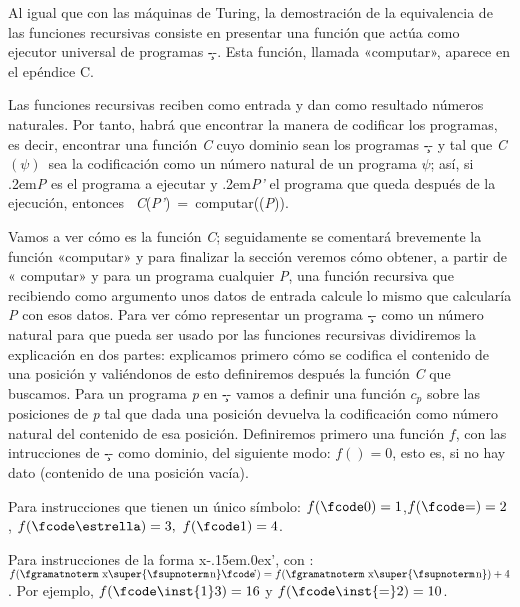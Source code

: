 Al igual que con las máquinas de Turing, la demostración de la equivalencia de las funciones
recursivas consiste en presentar una función que actúa como ejecutor universal de programas \c--.
Esta función, llamada «{\fgabrielen computar}», aparece en el epéndice C.

Las funciones recursivas reciben como entrada y dan como resultado números naturales. Por tanto,
habrá que encontrar la manera de codificar los programas, es decir, encontrar una función {\it C}
cuyo dominio sean los programas \c-- y tal que {\it C$ (\psi) $}\ sea la codificación
como un número natural de un programa $ \psi $; así, si \kern.2em{\it P\/} es el programa
a ejecutar y \kern.2em{\it P'\/} el programa que queda después de la ejecución, entonces \hbox{{\it
C}({\it P'}) = {\fgabrielen computar}(({\it P}))}.

Vamos a ver cómo es la función {\it C}; seguidamente se comentará brevemente la función
«{\fgabrielen computar}» y para finalizar la sección veremos cómo obtener, a partir de «{\fgabrielen
computar}» y para un programa cualquier {\it P}, una función recursiva que recibiendo como argumento
unos datos de entrada calcule lo mismo que calcularía {\it P} con esos datos.
Para ver cómo representar un programa \c-- como un número natural para que pueda ser usado por las
funciones recursivas dividiremos la explicación en dos partes: explicamos primero cómo se codifica
el contenido de una posición y valiéndonos de esto definiremos después la función {\it C} que
buscamos.
Para un programa {\it p} en \c-- vamos a definir una función $ c_p $ sobre las posiciones de {\it p}
tal que dada una posición devuelva la codificación como número natural del contenido de esa
posición. Definiremos primero una función $ f $, con las intrucciones de \c-- como dominio, del
siguiente modo:
\listanormal
$ f()= 0$, esto es, si no hay dato (contenido de una posición vacía).

Para instrucciones que tienen un único símbolo:
\espacioej$ f(\hbox{\fcode0})= 1$,\hskip22pt$ f(\hbox{\fcode=})=2 $,\hskip22pt $
f(\hbox{\fcode\estrella})=3, $\hskip22pt $ f(\hbox{\fcode1})=4 $.

Para instrucciones de la forma {\fgramatnoterm x\fcode\kern-.15em\lower.0ex\hbox{’}}, con \nnat:
\espacioej$ f(\hbox{{\fgramatnoterm x\super{\fsupnoterm\kern.1em n}%
\fcode\kern-.15em\lower.0ex\hbox{’}}}) =f(\hbox{{\fgramatnoterm x\super{\fsupnoterm\kern.1em n}}})+4 $.
\finlista
Por ejemplo, $ f(\hbox{{\fcode\inst{1}3}})=16 $ y $ f(\hbox{{\fcode\inst{=}2}})=10 $.

